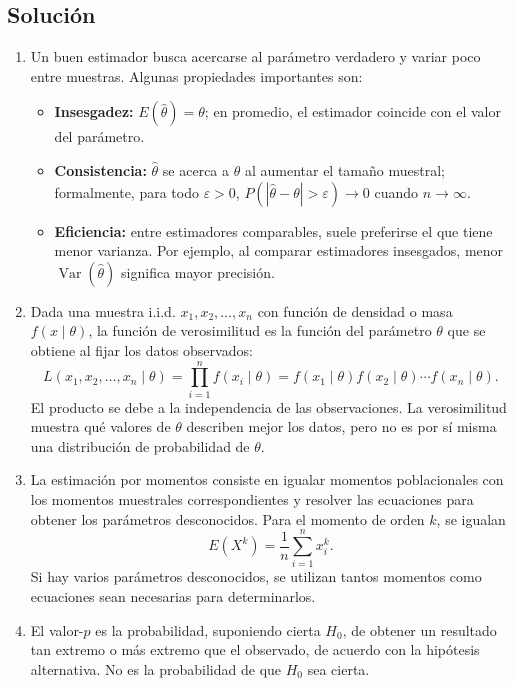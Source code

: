 \documentclass[12pt]{article}
\begin{document}
\subsection*{Solución}
\begin{enumerate}[label=(\alph*)]
    \item Un buen estimador busca acercarse al parámetro verdadero y variar poco entre muestras. Algunas propiedades importantes son:
    \begin{itemize}
        \item \textbf{Insesgadez:} $E(\hat{\theta})=\theta$; en promedio, el estimador coincide con el valor del parámetro.
        \item \textbf{Consistencia:} $\hat{\theta}$ se acerca a $\theta$ al aumentar el tamaño muestral; formalmente, para todo $\varepsilon>0$, $P(|\hat{\theta}-\theta|>\varepsilon)\to0$ cuando $n\to\infty$.
        \item \textbf{Eficiencia:} entre estimadores comparables, suele preferirse el que tiene menor varianza. Por ejemplo, al comparar estimadores insesgados, menor $\operatorname{Var}(\hat{\theta})$ significa mayor precisión.
    \end{itemize}

    \item Dada una muestra i.i.d. $x_1,x_2,\ldots,x_n$ con función de densidad o masa $f(x\mid\theta)$, la función de verosimilitud es la función del parámetro $\theta$ que se obtiene al fijar los datos observados:
    $$
    L(x_1,x_2,\ldots,x_n\mid\theta)
    =\prod_{i=1}^{n}f(x_i\mid\theta)
    =f(x_1\mid\theta)f(x_2\mid\theta)\cdots f(x_n\mid\theta).
    $$
    El producto se debe a la independencia de las observaciones. La verosimilitud muestra qué valores de $\theta$ describen mejor los datos, pero no es por sí misma una distribución de probabilidad de $\theta$.

    \item La estimación por momentos consiste en igualar momentos poblacionales con los momentos muestrales correspondientes y resolver las ecuaciones para obtener los parámetros desconocidos. Para el momento de orden $k$, se igualan
    $$
    E(X^k)=\frac{1}{n}\sum_{i=1}^{n}x_i^k.
    $$
    Si hay varios parámetros desconocidos, se utilizan tantos momentos como ecuaciones sean necesarias para determinarlos.

    \item El valor-$p$ es la probabilidad, suponiendo cierta $H_0$, de obtener un resultado tan extremo o más extremo que el observado, de acuerdo con la hipótesis alternativa. No es la probabilidad de que $H_0$ sea cierta.


\end{enumerate}
\end{document}
